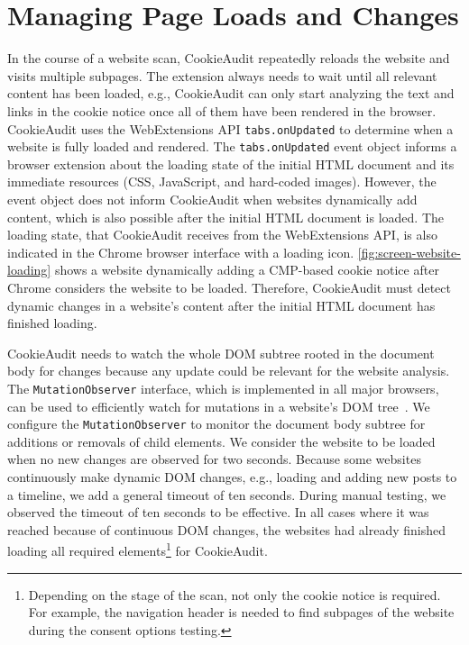 \section{Managing Page Loads and Changes}
In the course of a website scan, CookieAudit repeatedly reloads the website and visits multiple subpages.
The extension always needs to wait until all relevant content has been loaded, e.g., CookieAudit can only start analyzing the text and links in the cookie notice once all of them have been rendered in the browser.
CookieAudit uses the WebExtensions API \texttt{tabs.onUpdated} to determine when a website is fully loaded and rendered.
The \texttt{tabs.onUpdated} event object informs a browser extension about the loading state of the initial HTML document and its immediate resources (CSS, JavaScript, and hard-coded images).
However, the event object does not inform CookieAudit when websites dynamically add content, which is also possible after the initial HTML document is loaded.
The loading state, that CookieAudit receives from the WebExtensions API, is also indicated in the Chrome browser interface with a loading icon.
\cref{fig:screen-website-loading} shows a website dynamically adding a CMP-based cookie notice after Chrome considers the website to be loaded.
Therefore, CookieAudit must detect dynamic changes in a website's content after the initial HTML document has finished loading.

CookieAudit needs to watch the whole DOM subtree rooted in the document body for changes because any update could be relevant for the website analysis.
The \texttt{MutationObserver} interface, which is implemented in all major browsers, can be used to efficiently watch for mutations in a website's DOM tree~\cite{whatwg2024interface}.
We configure the \texttt{MutationObserver} to monitor the document body subtree for additions or removals of child elements.
We consider the website to be loaded when no new changes are observed for two seconds.
Because some websites continuously make dynamic DOM changes, e.g., loading and adding new posts to a timeline, we add a general timeout of ten seconds.
During manual testing, we observed the timeout of ten seconds to be effective.
In all cases where it was reached because of continuous DOM changes, the websites had already finished loading all required elements\footnote{
Depending on the stage of the scan, not only the cookie notice is required.
For example, the navigation header is needed to find subpages of the website during the consent options testing.
} for CookieAudit.

